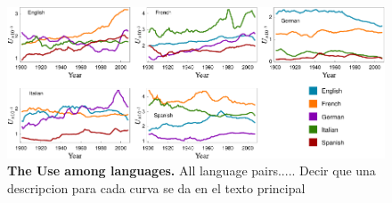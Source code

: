 \documentclass[10pt,letterpaper]{article} %
\begin{document}





\begin{figure}[!h]
	\begin{adjustwidth}{-2cm}{1cm}
		\centering
		\includegraphics{images/usoFinal.pdf}
		\caption{{\bf The Use among languages.}  All language pairs..... Decir que una descripcion para 
cada curva se da en el texto principal}
		\label{fig.UT_art}
	\end{adjustwidth}
\end{figure}
\end{document}
